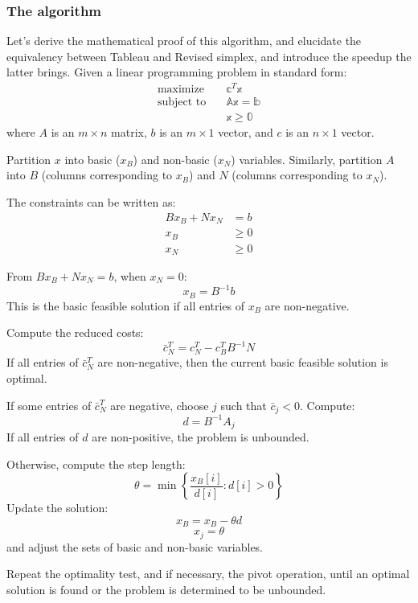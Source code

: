 \subsubsection*{The algorithm}
Let's derive the mathematical proof of this algorithm, and elucidate the
equivalency between Tableau and Revised simplex, and introduce the
speedup the latter brings.
Given a linear programming problem in standard form:
\begin{align*}
    \text{maximize} \quad   & \mathbb{c}^T \mathbb{x}           \\
    \text{subject to} \quad & \mathbb{A}\mathbb{x} = \mathbb{b} \\
                            & \mathbb{x} \geq \mathbb{0}
\end{align*}
where \( A \) is an \( m \times n \) matrix,
\( b \) is an \( m \times 1 \) vector, and
\( c \) is an \( n \times 1 \) vector.


Partition \( x \) into basic (\( x_B \)) and non-basic (\( x_N \)) variables.
Similarly, partition \( A \) into \( B \) (columns corresponding to \( x_B \))
and \( N \) (columns corresponding to \( x_N \)).

The constraints can be written as:
\begin{align*}
    Bx_B + Nx_N & = b    \\
    x_B         & \geq 0 \\
    x_N         & \geq 0
\end{align*}

From \( Bx_B + Nx_N = b \), when \( x_N = 0 \):
\[ x_B = B^{-1}b \]
This is the basic feasible solution if all entries of \( x_B \) are non-negative.

Compute the reduced costs:
\[ \bar{c}_N^T = c_N^T - c_B^T B^{-1} N \]
If all entries of \( \bar{c}_N^T \) are non-negative,
then the current basic feasible solution is optimal.

If some entries of \( \bar{c}_N^T \) are negative,
choose \( j \) such that \( \bar{c}_j < 0 \). Compute:
\[ d = B^{-1} A_j \]
If all entries of \( d \) are non-positive, the problem is unbounded.

Otherwise, compute the step length:
\[ \theta = \min \left\{ \frac{x_B[i]}{d[i]} : d[i] > 0 \right\} \]
Update the solution:
\[ x_B = x_B - \theta d \]
\[ x_j = \theta \]
and adjust the sets of basic and non-basic variables.

Repeat the optimality test, and if necessary, the pivot operation,
until an optimal solution is found or the problem is determined to be unbounded.

